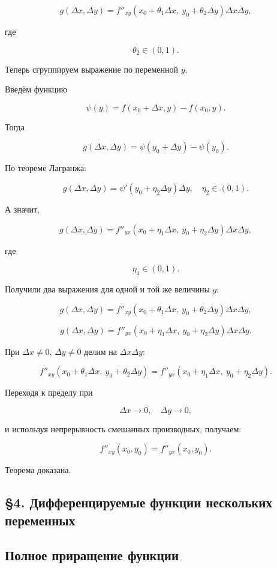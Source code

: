\documentclass[a4paper,12pt]{article}
\begin{document}
\[
g(\Delta x,\Delta y)
=
f''_{xy}(x_0+\theta_1\Delta x,\ y_0+\theta_2\Delta y)
\Delta x\Delta y,
\]

где

\[
\theta_2\in(0,1).
\]

Теперь сгруппируем выражение по переменной $y$.

Введём функцию

\[
\psi(y)
=
f(x_0+\Delta x,y)
-
f(x_0,y).
\]

Тогда

\[
g(\Delta x,\Delta y)
=
\psi(y_0+\Delta y)
-
\psi(y_0).
\]

По теореме Лагранжа:

\[
g(\Delta x,\Delta y)
=
\psi'(y_0+\eta_2\Delta y)\Delta y,
\quad
\eta_2\in(0,1).
\]

А значит,

\[
g(\Delta x,\Delta y)
=
f''_{yx}(x_0+\eta_1\Delta x,\ y_0+\eta_2\Delta y)
\Delta x\Delta y,
\]

где

\[
\eta_1\in(0,1).
\]

Получили два выражения для одной и той же величины $g$:

\[
g(\Delta x,\Delta y)
=
f''_{xy}(x_0+\theta_1\Delta x,\ y_0+\theta_2\Delta y)
\Delta x\Delta y,
\]

\[
g(\Delta x,\Delta y)
=
f''_{yx}(x_0+\eta_1\Delta x,\ y_0+\eta_2\Delta y)
\Delta x\Delta y.
\]

При $\Delta x\ne 0$, $\Delta y\ne 0$ делим на $\Delta x\Delta y$:

\[
f''_{xy}(x_0+\theta_1\Delta x,\ y_0+\theta_2\Delta y)
=
f''_{yx}(x_0+\eta_1\Delta x,\ y_0+\eta_2\Delta y).
\]

Переходя к пределу при

\[
\Delta x\to 0,
\quad
\Delta y\to 0,
\]

и используя непрерывность смешанных производных, получаем:

\[
f''_{xy}(x_0,y_0)
=
f''_{yx}(x_0,y_0).
\]

Теорема доказана.

\subsection*{§4. Дифференцируемые функции нескольких переменных}

\subsection*{Полное приращение функции}
\end{document}
